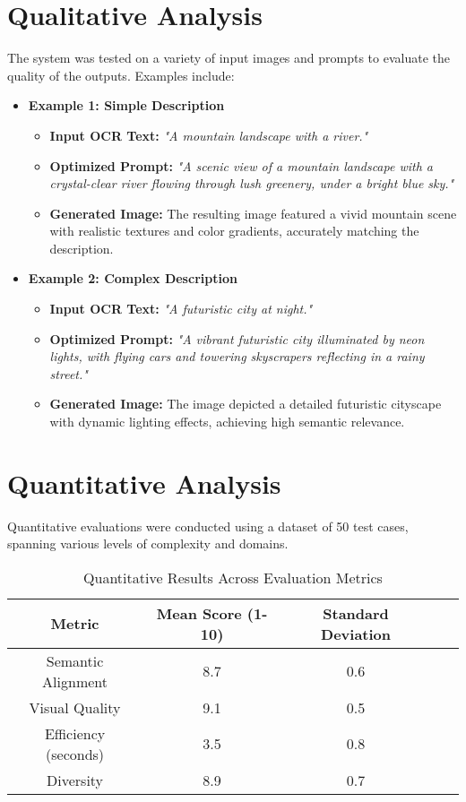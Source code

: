 \section{Qualitative Analysis}
The system was tested on a variety of input images and prompts to evaluate the quality of the outputs. Examples include:
\begin{itemize}
    \item \textbf{Example 1: Simple Description}
    \begin{itemize}
        \item \textbf{Input OCR Text:} \textit{"A mountain landscape with a river."}
        \item \textbf{Optimized Prompt:} \textit{"A scenic view of a mountain landscape with a crystal-clear river flowing through lush greenery, under a bright blue sky."}
        \item \textbf{Generated Image:} The resulting image featured a vivid mountain scene with realistic textures and color gradients, accurately matching the description.
    \end{itemize}
    \item \textbf{Example 2: Complex Description}
    \begin{itemize}
        \item \textbf{Input OCR Text:} \textit{"A futuristic city at night."}
        \item \textbf{Optimized Prompt:} \textit{"A vibrant futuristic city illuminated by neon lights, with flying cars and towering skyscrapers reflecting in a rainy street."}
        \item \textbf{Generated Image:} The image depicted a detailed futuristic cityscape with dynamic lighting effects, achieving high semantic relevance.
    \end{itemize}
\end{itemize}

\section{Quantitative Analysis}
Quantitative evaluations were conducted using a dataset of 50 test cases, spanning various levels of complexity and domains.
\begin{table}[h!]
\centering
\begin{tabular}{|c|c|c|c|c|}
\hline
\textbf{Metric} & \textbf{Mean Score (1-10)} & \textbf{Standard Deviation} \\
\hline
Semantic Alignment & 8.7 & 0.6 \\
Visual Quality & 9.1 & 0.5 \\
Efficiency (seconds) & 3.5 & 0.8 \\
Diversity & 8.9 & 0.7 \\
\hline
\end{tabular}
\caption{Quantitative Results Across Evaluation Metrics}
\end{table}


